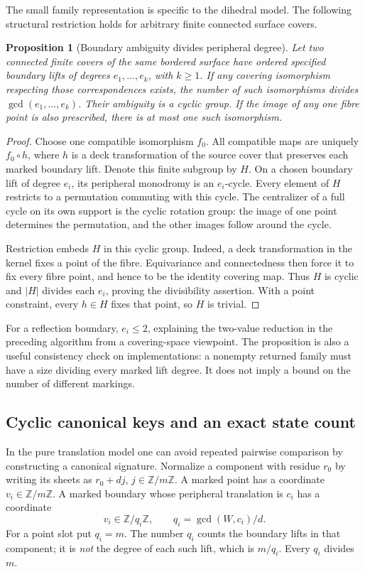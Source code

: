\documentclass[11pt]{article}
\newtheorem{proposition}[theorem]{Proposition}
\theoremstyle{definition}
\theoremstyle{remark}
\newcommand{\Z}{\mathbb Z}
\begin{document}
The small family representation is specific to the dihedral model.  The
following structural restriction holds for arbitrary finite connected
surface covers.

\begin{proposition}[Boundary ambiguity divides peripheral degree]\label{prop:bt-ambiguity}
Let two connected finite covers of the same bordered surface have ordered
specified boundary lifts of degrees $e_1,\ldots,e_k$, with $k\ge1$.
If any covering isomorphism respecting those correspondences exists,
the number of such isomorphisms divides $\gcd(e_1,\ldots,e_k)$.  Their
ambiguity is a cyclic group.  If the image of any one fibre point is also
prescribed, there is at most one such isomorphism.
\end{proposition}
\begin{proof}
Choose one compatible isomorphism $f_0$.  All compatible maps are uniquely
$f_0\circ h$, where $h$ is a deck transformation of the source cover that
preserves each marked boundary lift.  Denote this finite subgroup by $H$.
On a chosen boundary lift of degree $e_i$, its peripheral monodromy is an
$e_i$-cycle.  Every element of $H$ restricts to a permutation commuting
with this cycle.  The centralizer of a full cycle on its own support is
the cyclic rotation group: the image of one point determines the
permutation, and the other images follow around the cycle.

Restriction embeds $H$ in this cyclic group.  Indeed, a deck
transformation in the kernel fixes a point of the fibre.  Equivariance
and connectedness then force it to fix every fibre point, and hence to
be the identity covering map.  Thus $H$ is cyclic and $|H|$ divides each
$e_i$, proving the divisibility assertion.  With a point constraint,
every $h\in H$ fixes that point, so $H$ is trivial.
\end{proof}

For a reflection boundary, $e_i\le2$, explaining the two-value reduction
in the preceding algorithm from a covering-space viewpoint.  The
proposition is also a useful consistency check on implementations: a
nonempty returned family must have a size dividing every marked lift
degree.  It does not imply a bound on the number of different markings.

\subsection{Cyclic canonical keys and an exact state count}

In the pure translation model one can avoid repeated pairwise comparison
by constructing a canonical signature.  Normalize a component with residue
$r_0$ by writing its sheets as $r_0+dj$, $j\in\Z/m\Z$.  A marked point
has a coordinate $v_i\in\Z/m\Z$.  A marked boundary whose peripheral
translation is $c_i$ has a coordinate
\[
 v_i\in\Z/q_i\Z,\qquad q_i=\gcd(W,c_i)/d.
\]
For a point slot put $q_i=m$.  The number $q_i$ counts the boundary lifts
in that component; it is \emph{not} the degree of each such lift, which
is $m/q_i$.  Every $q_i$ divides $m$.
\end{document}
